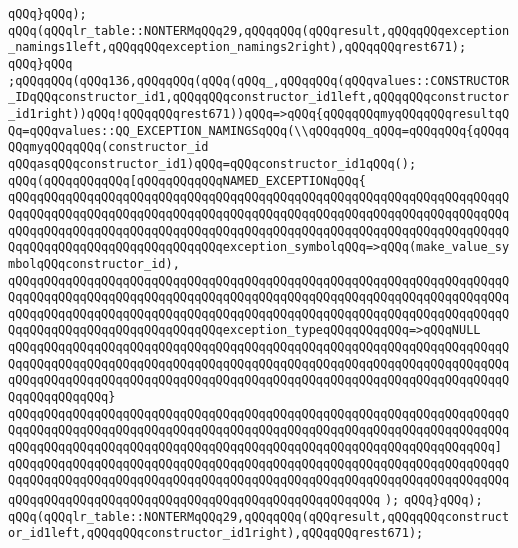 \verb|qQQq}qQQq);|\newline
\verb|qQQq(qQQqlr_table::NONTERMqQQq29,qQQqqQQq(qQQqresult,qQQqqQQqexception_namings1left,qQQqqQQqexception_namings2right),qQQqqQQqrest671);|\newline
\verb|qQQq}qQQq|\newline
\verb|;qQQqqQQq(qQQq136,qQQqqQQq(qQQq(qQQq_,qQQqqQQq(qQQqvalues::CONSTRUCTOR_IDqQQqconstructor_id1,qQQqqQQqconstructor_id1left,qQQqqQQqconstructor_id1right))qQQq!qQQqqQQqrest671))qQQq=>qQQq{qQQqqQQqmyqQQqqQQqresultqQQq=qQQqvalues::QQ_EXCEPTION_NAMINGSqQQq(\\qQQqqQQq_qQQq=qQQqqQQq{qQQqqQQqmyqQQqqQQq(constructor_id|\newline
\verb|qQQqasqQQqconstructor_id1)qQQq=qQQqconstructor_id1qQQq();|\newline
\verb|qQQq(qQQqqQQqqQQq[qQQqqQQqqQQqNAMED_EXCEPTIONqQQq{|\newline
\verb|qQQqqQQqqQQqqQQqqQQqqQQqqQQqqQQqqQQqqQQqqQQqqQQqqQQqqQQqqQQqqQQqqQQqqQQqqQQqqQQqqQQqqQQqqQQqqQQqqQQqqQQqqQQqqQQqqQQqqQQqqQQqqQQqqQQqqQQqqQQqqQQqqQQqqQQqqQQqqQQqqQQqqQQqqQQqqQQqqQQqqQQqqQQqqQQqqQQqqQQqqQQqqQQqqQQqqQQqqQQqqQQqqQQqqQQqqQQqqQQqexception_symbolqQQq=>qQQq(make_value_symbolqQQqconstructor_id),|\newline
\verb|qQQqqQQqqQQqqQQqqQQqqQQqqQQqqQQqqQQqqQQqqQQqqQQqqQQqqQQqqQQqqQQqqQQqqQQqqQQqqQQqqQQqqQQqqQQqqQQqqQQqqQQqqQQqqQQqqQQqqQQqqQQqqQQqqQQqqQQqqQQqqQQqqQQqqQQqqQQqqQQqqQQqqQQqqQQqqQQqqQQqqQQqqQQqqQQqqQQqqQQqqQQqqQQqqQQqqQQqqQQqqQQqqQQqqQQqqQQqqQQqexception_typeqQQqqQQqqQQq=>qQQqNULL|\newline
\verb|qQQqqQQqqQQqqQQqqQQqqQQqqQQqqQQqqQQqqQQqqQQqqQQqqQQqqQQqqQQqqQQqqQQqqQQqqQQqqQQqqQQqqQQqqQQqqQQqqQQqqQQqqQQqqQQqqQQqqQQqqQQqqQQqqQQqqQQqqQQqqQQqqQQqqQQqqQQqqQQqqQQqqQQqqQQqqQQqqQQqqQQqqQQqqQQqqQQqqQQqqQQqqQQqqQQqqQQqqQQqqQQq}|\newline
\verb|qQQqqQQqqQQqqQQqqQQqqQQqqQQqqQQqqQQqqQQqqQQqqQQqqQQqqQQqqQQqqQQqqQQqqQQqqQQqqQQqqQQqqQQqqQQqqQQqqQQqqQQqqQQqqQQqqQQqqQQqqQQqqQQqqQQqqQQqqQQqqQQqqQQqqQQqqQQqqQQqqQQqqQQqqQQqqQQqqQQqqQQqqQQqqQQqqQQqqQQqqQQqqQQq]|\newline
\verb|qQQqqQQqqQQqqQQqqQQqqQQqqQQqqQQqqQQqqQQqqQQqqQQqqQQqqQQqqQQqqQQqqQQqqQQqqQQqqQQqqQQqqQQqqQQqqQQqqQQqqQQqqQQqqQQqqQQqqQQqqQQqqQQqqQQqqQQqqQQqqQQqqQQqqQQqqQQqqQQqqQQqqQQqqQQqqQQqqQQqqQQqqQQqqQQq|\newline
\verb|);|\newline
\verb|qQQq}qQQq);|\newline
\verb|qQQq(qQQqlr_table::NONTERMqQQq29,qQQqqQQq(qQQqresult,qQQqqQQqconstructor_id1left,qQQqqQQqconstructor_id1right),qQQqqQQqrest671);|\newline
